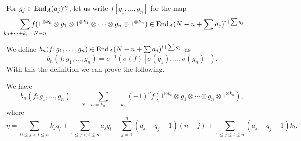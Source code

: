 \documentclass[Thesis.tex]{subfiles}
\begin{document}
For $g_j\in \operatorname{End}_A(a_j)^{q_j}$, let us write $f[g_1,\dots, g_n]$ for the map 
\[\sum_{\mathclap{k_0+\cdots+k_n=N-n}}f(1^{\otimes k_0}\otimes g_1\otimes 1^{\otimes k_1}\otimes\cdots\otimes g_n\otimes 1^{\otimes k_n})\in \End_A(N-n+\sum a_j)^{i+\sum q_j}\]

We define $b_n(f;g_1,\dots, g_n)\in \operatorname{End}_A(N-n+\sum a_j)^{i+\sum q_j}$ as
\[b_n(f;g_1,\dots, g_n)=\sigma^{-1}(\sigma(f)[\sigma(g_1),\dots, \sigma(g_n)]).\]
With this the definition we can prove the following.
\begin{lem}\label{rwversion}
 We have
\[b_n(f;g_1,\dots,g_n)=\sum_{N-n=k_0+\cdots+k_n} (-1)^\eta
f(1^{\otimes k_0}\otimes g_1\otimes \cdots\otimes g_n\otimes1^{\otimes k_n}),\]
where 
\[\eta=\sum_{0\leq j<l\leq n}k_jq_l+\sum_{1\leq j<l\leq n}a_jq_l+\sum_{j=1}^n (a_j+q_j-1)(n-j)+\sum_{1\leq j\leq l\leq n} (a_j+q_j-1)k_l.\]
\end{lem} 


 
\end{document}
